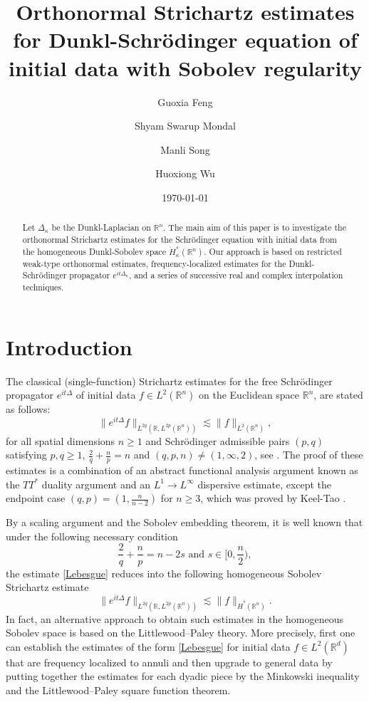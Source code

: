 \documentclass[a4paper,11pt, reqno]{amsart}
\title[Orthonormal Strichartz estimates for Dunkl-Schr\"{o}dinger equation with Sobolev regularity]{Orthonormal Strichartz estimates for Dunkl-Schr\"{o}dinger equation of initial data with Sobolev regularity
}
\author{Guoxia Feng}
\author{Shyam Swarup Mondal}
\author{Manli Song}
\author{Huoxiong Wu}
\date{\today}
\numberwithin{equation}{section}
\theoremstyle{plain}
\theoremstyle{definition}
\theoremstyle{remark}
\begin{document}
	
	\maketitle
	
	
	\allowdisplaybreaks
	
	
	
\begin{abstract}
Let $\Delta_\kappa$ be the Dunkl-Laplacian on $\mathbb{R}^n$. The main aim of this paper is to investigate the orthonormal Strichartz estimates for the Schrödinger equation with initial data from the homogeneous Dunkl-Sobolev space $\dot{H}_\kappa^s (\mathbb{R}^n)$. Our approach is based on restricted weak-type orthonormal estimates, frequency-localized estimates for the Dunkl-Schr\"odinger propagator $e^{it\Delta_\kappa}$, and a series of successive real and complex interpolation techniques. 
\end{abstract}
	\tableofcontents 	
 
 
	\section{Introduction}
The classical (single-function) Strichartz estimates for the free Schr\"{o}dinger propagator $e^{it\Delta}$ of initial data $f\in L^2( \mathbb{R}^n)$ on the Euclidean space $\mathbb{R}^n$, are stated as follows:
\begin{equation}\label{Lebesgue}
\|e^{it\Delta}f\|_{L^{2q}(\mathbb{R},L^{2p}(\mathbb{R}^n))}\lesssim \|f\|_{L^2(\mathbb{R}^n)},
\end{equation}
for all spatial dimensions $n\geq1$ and Schr\"{o}dinger admissible pairs $(p,q)$ satisfying $p,q\geq1$, $\frac{2}{q}+\frac{n}{p}=n$ and $(q,p,n)\neq (1,\infty,2)$, see \cite{Str}. The proof of these estimates is a combination of an abstract functional analysis argument known as the $TT^*$ duality argument and an $L^1\rightarrow L^\infty$ dispersive estimate, except the endpoint case $(q,p)=(1,\frac{n}{n-2})$ for $n\geq3$, which was proved by Keel-Tao \cite{KT}. 


By a scaling argument and the Sobolev embedding theorem, it is well known that  under the  following  necessary condition
\begin{equation*}
\frac{2}{q}+\frac{n}{p}=n-2s\text{ and }s\in [0,\frac{n}{2}),
\end{equation*}
the estimate  \eqref{Lebesgue} reduces into    the  following  homogeneous Sobolev Strichartz estimate  
\begin{equation*} \|e^{it\Delta}f\|_{L^{2q}(\mathbb{R},L^{2p}(\mathbb{R}^n))}\lesssim \|f\|_{\dot{H}^s(\mathbb{R}^n)}.
\end{equation*} 
In fact, an alternative approach to obtain such estimates in the homogeneous Sobolev space is based on the Littlewood–Paley theory. More precisely, first  one can establish the estimates of the form \eqref{Lebesgue} for initial data $f\in L^2(\mathbb{R}^d)$
that are frequency localized to annuli and then upgrade to general data by putting together the estimates for each dyadic piece by the Minkowski inequality and the Littlewood–Paley square function theorem.
\end{document}
